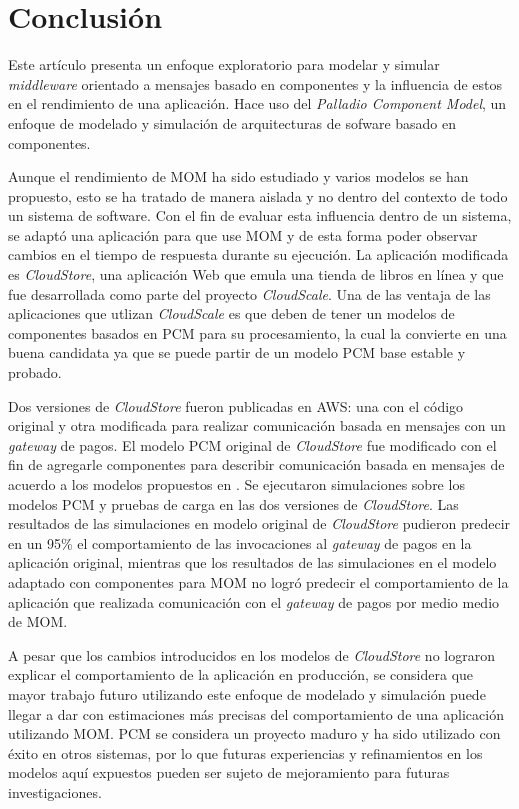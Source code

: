 \documentclass[conference]{IEEEtran}
\begin{document}
\section{Conclusión} \label{sec:conclusion}
Este artículo presenta un enfoque exploratorio para modelar y simular \emph{middleware} orientado a mensajes basado en componentes y la influencia de estos en el rendimiento de una aplicación. Hace uso del \emph{Palladio Component Model}, un enfoque de modelado y simulación de arquitecturas de sofware basado en componentes.

Aunque el rendimiento de MOM ha sido estudiado y varios modelos se han propuesto, esto se ha tratado de manera aislada y no dentro del contexto de todo un sistema de software. Con el fin de evaluar esta influencia dentro de un sistema, se adaptó una aplicación para que use MOM y de esta forma poder observar cambios en el tiempo de respuesta durante su ejecución. La aplicación modificada es \emph{CloudStore}, una aplicación Web que emula una tienda de libros en línea y que fue desarrollada como parte del proyecto \emph{CloudScale}. Una de las ventaja de las aplicaciones que utlizan \emph{CloudScale} es que deben de tener un modelos de componentes basados en PCM para su procesamiento, la cual la convierte en una buena candidata ya que se puede partir de un modelo PCM base estable y probado.

Dos versiones de \emph{CloudStore} fueron publicadas en AWS: una con el código original y otra modificada para realizar comunicación basada en mensajes con un \emph{gateway} de pagos. El modelo PCM original de \emph{CloudStore} fue modificado con el fin de agregarle componentes para describir comunicación basada en mensajes de acuerdo a los modelos propuestos en \cite{happe-et-al}. Se ejecutaron simulaciones sobre los modelos PCM y pruebas de carga en las dos versiones de \emph{CloudStore}. Las resultados de las simulaciones en modelo original de \emph{CloudStore} pudieron predecir en un 95\% el comportamiento de las invocaciones al \emph{gateway} de pagos en la aplicación original, mientras que los resultados de las simulaciones en el modelo adaptado con componentes para MOM no logró predecir el comportamiento de la aplicación que realizada comunicación con el \emph{gateway} de pagos por medio medio de MOM. 
 
A pesar que los cambios introducidos en los modelos de \emph{CloudStore} no lograron explicar el comportamiento de la aplicación en producción, se considera que mayor trabajo futuro utilizando este enfoque de modelado y simulación puede llegar a dar con estimaciones más precisas del comportamiento de una aplicación utilizando MOM. PCM se considera un proyecto maduro y ha sido utilizado con éxito en otros sistemas, por lo que futuras experiencias y refinamientos en los modelos aquí expuestos pueden ser sujeto de mejoramiento para futuras investigaciones.
\end{document}
